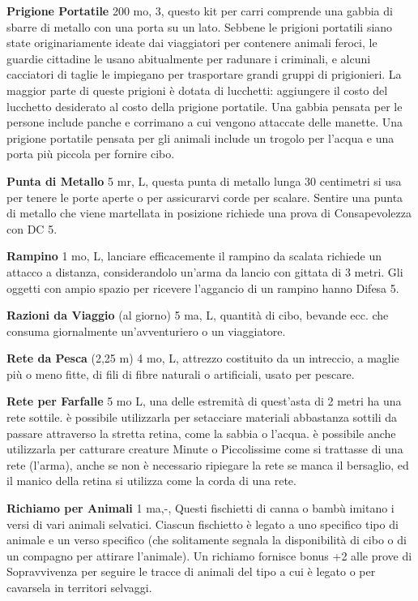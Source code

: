 \documentclass[a4paper,11pt,twoside,openany]{book}
\begin{document}
{\textbf{Prigione Portatile} 200 mo, 3, questo kit per carri comprende una gabbia di sbarre di metallo con una porta su un lato. Sebbene le prigioni portatili siano state originariamente ideate dai viaggiatori per contenere animali feroci, le guardie cittadine le usano abitualmente per radunare i criminali, e alcuni cacciatori di taglie le impiegano per trasportare grandi gruppi di prigionieri. La maggior parte di queste prigioni è dotata di lucchetti: aggiungere il costo del lucchetto desiderato al costo della prigione portatile. Una gabbia pensata per le persone include panche e corrimano a cui vengono attaccate delle manette. Una prigione portatile pensata per gli animali include un trogolo per l'acqua e una porta più piccola per fornire cibo.

\textbf{Punta di Metallo} 5 mr, L, questa punta di metallo lunga 30 centimetri si usa per tenere le porte aperte o per assicurarvi corde per scalare. Sentire una punta di metallo che viene martellata in posizione richiede una prova di Consapevolezza con DC 5.

\textbf{Rampino} 1 mo, L, lanciare efficacemente il rampino da scalata richiede un attacco a distanza, considerandolo un'arma da lancio con gittata di 3 metri. Gli oggetti con ampio spazio per ricevere l'aggancio di un rampino hanno Difesa 5.

\textbf{Razioni da Viaggio} (al giorno) 5 ma, L, quantità di cibo, bevande ecc. che consuma giornalmente un'avventuriero o un viaggiatore.

\textbf{Rete da Pesca} (2,25 m) 4 mo, L, attrezzo costituito da un intreccio, a maglie più o meno fitte, di fili di fibre naturali o artificiali, usato per pescare.

\textbf{Rete per Farfalle} 5 mo L, una delle estremità di quest'asta di 2 metri ha una rete sottile. è possibile utilizzarla per setacciare materiali abbastanza sottili da passare attraverso la stretta retina, come la sabbia o l'acqua. è possibile anche utilizzarla per catturare creature Minute o Piccolissime come si trattasse di una rete (l'arma), anche se non è necessario ripiegare la rete se manca il bersaglio, ed il manico della retina si utilizza come la corda di una rete.

\textbf{Richiamo per Animali} 1 ma,-, Questi fischietti di canna o bambù imitano i versi di vari animali selvatici. Ciascun fischietto è legato a uno specifico tipo di animale e un verso specifico (che solitamente segnala la disponibilità di cibo o di un compagno per attirare l'animale). Un richiamo fornisce bonus +2 alle prove di Sopravvivenza per seguire le tracce di animali del tipo a cui è legato o per cavarsela in territori selvaggi.

}
\end{document}
